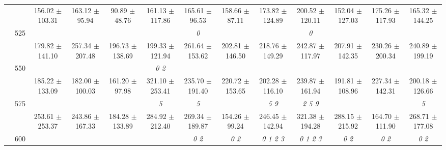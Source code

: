 \begin{table}[h]
{\begin{tabular}{
        ccccccccccccc}
 & & 156.02 $\pm$ 103.31& 163.12 $\pm$ 95.94& 90.89 $\pm$ 48.76& 161.13 $\pm$ 117.86& 165.61 $\pm$ 96.53& 158.66 $\pm$ 87.11& 173.82 $\pm$ 124.89& 200.52 $\pm$ 120.11& 152.04 $\pm$ 127.03& 175.26 $\pm$ 117.93& 165.32 $\pm$ 144.25 \\ 
 & \multirow{2}{*}{525}& \cellcolor[HTML]{EFEFEF} & \cellcolor[HTML]{EFEFEF} & \cellcolor[HTML]{EFEFEF} & \cellcolor[HTML]{EFEFEF} & \cellcolor[HTML]{EFEFEF} \textit{ 0 }& \cellcolor[HTML]{EFEFEF} & \cellcolor[HTML]{EFEFEF} & \cellcolor[HTML]{EFEFEF} \textit{ 0 }& \cellcolor[HTML]{EFEFEF} & \cellcolor[HTML]{EFEFEF} & \cellcolor[HTML]{EFEFEF}  \\ 
 & & \cellcolor[HTML]{EFEFEF} 179.82 $\pm$ 141.10& \cellcolor[HTML]{EFEFEF} 257.34 $\pm$ 207.48& \cellcolor[HTML]{EFEFEF} 196.73 $\pm$ 138.69& \cellcolor[HTML]{EFEFEF} 199.33 $\pm$ 121.94& \cellcolor[HTML]{EFEFEF} 261.64 $\pm$ 153.62& \cellcolor[HTML]{EFEFEF} 202.81 $\pm$ 146.50& \cellcolor[HTML]{EFEFEF} 218.76 $\pm$ 149.29& \cellcolor[HTML]{EFEFEF} 242.87 $\pm$ 117.97& \cellcolor[HTML]{EFEFEF} 207.91 $\pm$ 142.35& \cellcolor[HTML]{EFEFEF} 230.26 $\pm$ 200.34& \cellcolor[HTML]{EFEFEF} 240.89 $\pm$ 199.19 \\ 
 & \multirow{2}{*}{550}& & & & \textit{ 0 2 }& & & & & & &  \\ 
 & & 185.22 $\pm$ 133.09& 182.00 $\pm$ 100.03& 161.20 $\pm$ 97.98& 321.10 $\pm$ 253.41& 235.70 $\pm$ 191.40& 220.72 $\pm$ 153.65& 202.28 $\pm$ 116.10& 239.87 $\pm$ 161.94& 191.81 $\pm$ 108.96& 227.34 $\pm$ 142.31& 200.18 $\pm$ 126.66 \\ 
 & \multirow{2}{*}{575}& \cellcolor[HTML]{EFEFEF} & \cellcolor[HTML]{EFEFEF} & \cellcolor[HTML]{EFEFEF} & \cellcolor[HTML]{EFEFEF} \textit{ 5 }& \cellcolor[HTML]{EFEFEF} \textit{ 5 }& \cellcolor[HTML]{EFEFEF} & \cellcolor[HTML]{EFEFEF} \textit{ 5 9 }& \cellcolor[HTML]{EFEFEF} \textit{ 2 5 9 }& \cellcolor[HTML]{EFEFEF} & \cellcolor[HTML]{EFEFEF} & \cellcolor[HTML]{EFEFEF} \textit{ 5 } \\ 
 & & \cellcolor[HTML]{EFEFEF} 253.61 $\pm$ 253.37& \cellcolor[HTML]{EFEFEF} 243.86 $\pm$ 167.33& \cellcolor[HTML]{EFEFEF} 184.28 $\pm$ 133.89& \cellcolor[HTML]{EFEFEF} 284.92 $\pm$ 212.40& \cellcolor[HTML]{EFEFEF} 269.34 $\pm$ 189.87& \cellcolor[HTML]{EFEFEF} 154.26 $\pm$ 99.24& \cellcolor[HTML]{EFEFEF} 246.45 $\pm$ 142.94& \cellcolor[HTML]{EFEFEF} 321.38 $\pm$ 194.28& \cellcolor[HTML]{EFEFEF} 288.15 $\pm$ 215.92& \cellcolor[HTML]{EFEFEF} 164.70 $\pm$ 111.90& \cellcolor[HTML]{EFEFEF} 268.71 $\pm$ 177.08 \\ 
 & \multirow{2}{*}{600}& & & & & \textit{ 0 2 }& \textit{ 0 2 }& \textit{ 0 1 2 3 }& \textit{ 0 1 2 3 }& \textit{ 0 2 }& \textit{ 0 2 }& \textit{ 0 2 } \\ 

\end{tabular}}
\end{table}
